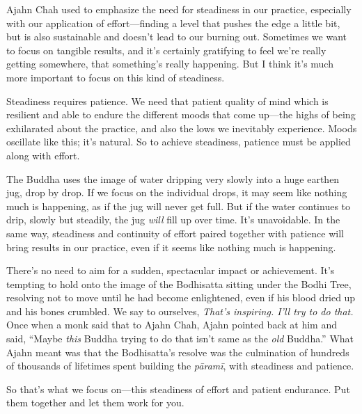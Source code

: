 
Ajahn Chah used to emphasize the need for steadiness in our practice, 
especially with our application of effort---finding a level that pushes 
the edge a little bit, but is also sustainable and doesn't lead to our 
burning out. Sometimes we want to focus on tangible results, and it's 
certainly gratifying to feel we're really getting somewhere, that 
something's really happening. But I think it's much more important to 
focus on this kind of steadiness.

Steadiness requires patience. We need that patient quality of mind 
which is resilient and able to endure the different moods that come 
up---the highs of being exhilarated about the practice, and also the 
lows we inevitably experience. Moods oscillate like this; it's natural. 
So to achieve steadiness, patience must be applied along with effort.

The Buddha uses the image of water dripping very slowly into a huge 
earthen jug, drop by drop. If we focus on the individual drops, it may 
seem like nothing much is happening, as if the jug will never get full. 
But if the water continues to drip, slowly but steadily, the jug 
\emph{will} fill up over time. It's unavoidable. In the same way, 
steadiness and continuity of effort paired together with patience will 
bring results in our practice, even if it seems like nothing much is 
happening.

There's no need to aim for a sudden, spectacular impact or achievement. 
It's tempting to hold onto the image of the Bodhisatta sitting under 
the Bodhi Tree, resolving not to move until he had become enlightened, 
even if his blood dried up and his bones crumbled. We say to ourselves, 
\emph{That's inspiring. I'll try to do that.} Once when a monk said 
that to Ajahn Chah, Ajahn pointed back at him and said, ``Maybe 
\emph{this} Buddha trying to do that isn't same as the \emph{old} 
Buddha.'' What Ajahn meant was that the Bodhisatta's resolve was the 
culmination of hundreds of thousands of lifetimes spent building the 
\emph{pāramī}, with steadiness and patience.

So that's what we focus on---this steadiness of effort and patient 
endurance. Put them together and let them work for you.


